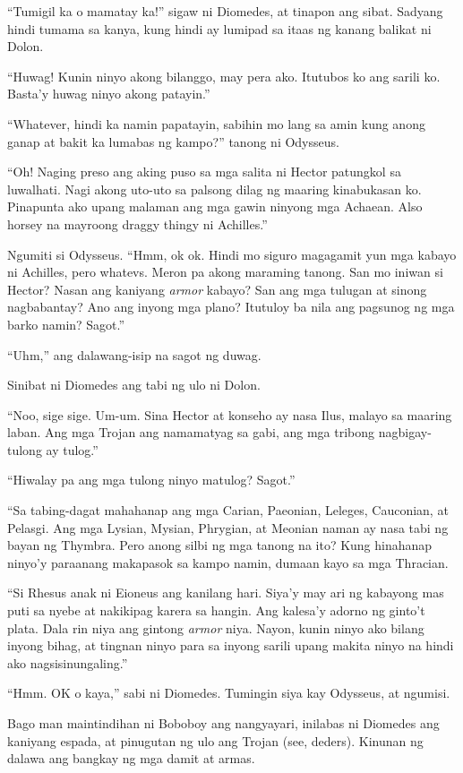 \documentclass[12pt,letterpaper]{report}
\begin{document}
``Tumigil ka o mamatay ka!'' sigaw ni Diomedes, at tinapon ang sibat. Sadyang hindi tumama sa kanya, kung hindi ay lumipad sa itaas ng kanang balikat ni Dolon.

``Huwag! Kunin ninyo akong bilanggo, may pera ako. Itutubos ko ang sarili ko. Basta'y huwag ninyo akong patayin.''

``Whatever, hindi ka namin papatayin, sabihin mo lang sa amin kung anong ganap at bakit ka lumabas ng kampo?'' tanong ni Odysseus.

``Oh! Naging preso ang aking puso sa mga salita ni Hector patungkol sa luwalhati. Nagi akong uto-uto sa palsong dilag ng maaring kinabukasan ko. Pinapunta ako upang malaman ang mga gawin ninyong mga Achaean. Also horsey na mayroong draggy thingy ni Achilles.''

Ngumiti si Odysseus. ``Hmm, ok ok. Hindi mo siguro magagamit yun mga kabayo ni Achilles, pero whatevs. Meron pa akong maraming tanong. San mo iniwan si Hector? Nasan ang kaniyang \textit{armor} kabayo? San ang mga tulugan at sinong nagbabantay? Ano ang inyong mga plano? Itutuloy ba nila ang pagsunog ng mga barko namin? Sagot.''

``Uhm,'' ang dalawang-isip na sagot ng duwag.

Sinibat ni Diomedes ang tabi ng ulo ni Dolon.

``Noo, sige sige. Um-um. Sina Hector at konseho ay nasa Ilus, malayo sa maaring laban. Ang mga Trojan ang namamatyag sa gabi, ang mga tribong nagbigay-tulong ay tulog.''

``Hiwalay pa ang mga tulong ninyo matulog? Sagot.''

``Sa tabing-dagat mahahanap ang mga Carian, Paeonian, Leleges, Cauconian, at Pelasgi. Ang mga Lysian, Mysian, Phrygian, at Meonian naman ay nasa tabi ng bayan ng Thymbra. Pero anong silbi ng mga tanong na ito? Kung hinahanap ninyo'y paraanang makapasok sa kampo namin, dumaan kayo sa mga Thracian.

``Si Rhesus anak ni Eioneus ang kanilang hari. Siya'y may ari ng kabayong mas puti sa nyebe at nakikipag karera sa hangin. Ang kalesa'y adorno ng ginto't plata. Dala rin niya ang gintong \textit{armor} niya. Nayon, kunin ninyo ako bilang inyong bihag, at tingnan ninyo para sa inyong sarili upang makita ninyo na hindi ako nagsisinungaling.''

``Hmm. OK o kaya,'' sabi ni Diomedes. Tumingin siya kay Odysseus, at ngumisi.

Bago man maintindihan ni Boboboy ang nangyayari, inilabas ni Diomedes ang kaniyang espada, at pinugutan ng ulo ang Trojan (see, deders). Kinunan ng dalawa ang bangkay ng mga damit at armas.
\end{document}
